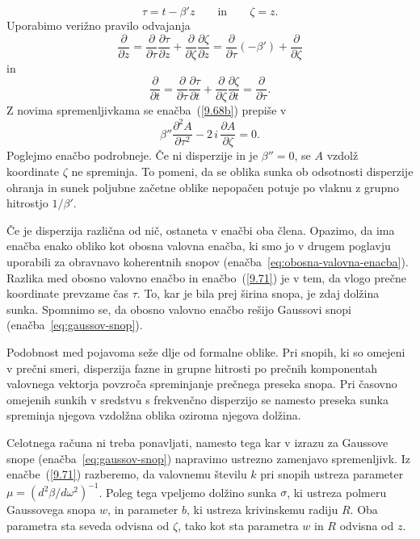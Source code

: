 \begin{equation}
\tau  =  t-\beta'z\nonumber \qquad \mathrm{in} \qquad \zeta = z.
\label{9.70}
\end{equation}
Uporabimo verižno pravilo odvajanja
\begin{equation}
 \frac{\partial}{\partial z}= \frac{\partial}{\partial\tau}\frac{\partial\tau}{\partial z}+ 
 \frac{\partial}{\partial\zeta}\frac{\partial\zeta}{\partial z} = 
 \frac{\partial}{\partial\tau}\left(-\beta'\right)+ \frac{\partial}{\partial \zeta}
\end{equation}
in 
\begin{equation}
 \frac{\partial}{\partial t}= \frac{\partial}{\partial\tau}\frac{\partial\tau}{\partial t}+ 
 \frac{\partial}{\partial\zeta}\frac{\partial\zeta}{\partial t} = 
 \frac{\partial}{\partial\tau}.
\end{equation}
Z novima spremenljivkama se enačba~(\ref{9.68b}) prepiše v 
\begin{equation}
\beta''\frac{\partial^{2}A}{\partial\tau^{2}}-
2\, i\,\frac{\partial A}{\partial\zeta}=0.
\label{9.71}
\end{equation}
Poglejmo enačbo podrobneje. Če ni disperzije in je $\beta''=0$, se $A$
vzdolž koordinate $\zeta$ ne spreminja. To pomeni, da se oblika sunka
ob odsotnosti disperzije ohranja in sunek poljubne začetne oblike nepopačen 
potuje po vlaknu z grupno hitrostjo $1/\beta'$.

Če je disperzija različna od nič, ostaneta v enačbi oba člena. Opazimo, da
ima enačba enako obliko kot obosna valovna enačba, ki smo jo v
drugem poglavju uporabili za obravnavo koherentnih 
snopov (enačba~\ref{eq:obosna-valovna-enacba}). 
Razlika med obosno valovno enačbo in enačbo~(\ref{9.71}) je v tem, da vlogo
prečne koordinate prevzame čas $\tau$. To, kar je bila prej širina snopa, 
je zdaj dolžina sunka. Spomnimo se, da 
obosno valovno enačbo rešijo Gaussovi snopi (enačba~\ref{eq:gaussov-snop}). 

\begin{remark}
Podobnost med pojavoma seže dlje od formalne oblike. Pri snopih, ki so omejeni 
v prečni smeri, disperzija fazne in grupne hitrosti po prečnih komponentah valovnega
vektorja povzroča spreminjanje prečnega preseka snopa. Pri časovno
omejenih sunkih v sredstvu s frekvenčno disperzijo se namesto preseka sunka
spreminja njegova vzdolžna oblika oziroma njegova dolžina.
\end{remark}

Celotnega računa
ni treba ponavljati, namesto tega kar v izrazu za Gaussove snope 
(enačba~\ref{eq:gaussov-snop}) napravimo ustrezno zamenjavo spremenljivk. 
Iz enačbe~(\ref{9.71}) razberemo, da valovnemu številu $k$ pri snopih  
ustreza parameter $\mu=(d^{2}\beta/d\omega^{2})^{-1}$. Poleg tega vpeljemo
dolžino sunka $\sigma$, ki ustreza polmeru Gaussovega snopa $w$, in parameter
$b$, ki ustreza krivinskemu radiju $R$. Oba parametra sta seveda odvisna od $\zeta$, 
tako kot sta parametra $w$ in $R$ odvisna od $z$. 

